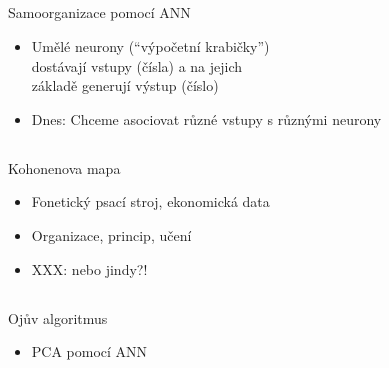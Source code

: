 \documentclass{beamer}
\begin{document}
\subsection{}
\begin{frame}{Samoorganizace pomocí ANN}
\begin{itemize}
\item Umělé neurony (``výpočetní krabičky'') \\ dostávají vstupy (čísla) a na jejich \\ základě generují výstup (číslo)
\item Dnes: Chceme asociovat různé vstupy s různými neurony
\end{itemize}
\end{frame}

\subsection{}
\begin{frame}{Kohonenova mapa}
\begin{itemize}
\item Fonetický psací stroj, ekonomická data
\item Organizace, princip, učení
\item XXX: nebo jindy?!
\end{itemize}
\end{frame}

\subsection{}
\begin{frame}{Ojův algoritmus}
\begin{itemize}
\item PCA pomocí ANN
\end{itemize}
\end{frame}
\end{document}
